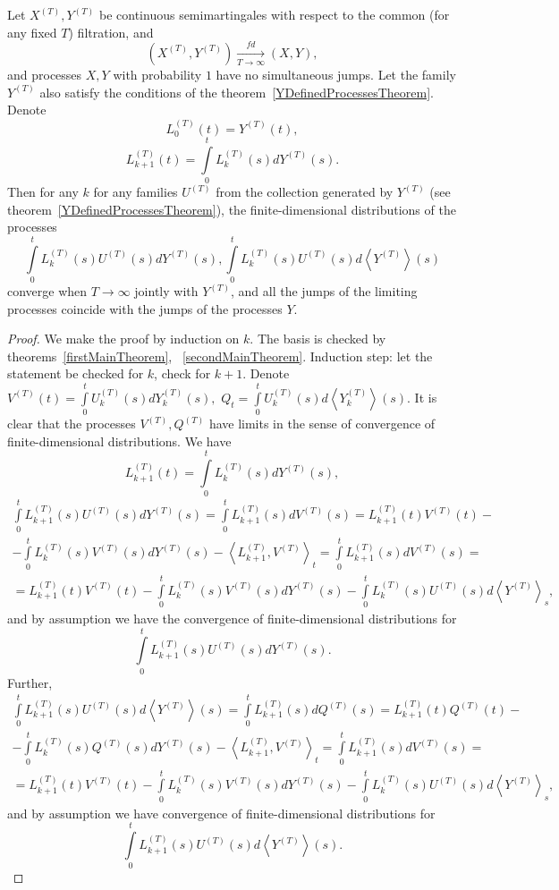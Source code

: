 \documentclass[12pt, a4paper, titlepage]{article}
\begin{document}
\begin{theorem}\label{generalTheorem}
Let $X^{(T)}, Y^{(T)}$ be continuous semimartingales
with respect to the common (for any fixed $T$)
filtration, and
$$(X^{(T)}, Y^{(T)})\xrightarrow[T \to \infty]{fd}(X, Y),$$
and processes $X, Y$ with probability $1$ have no simultaneous jumps.  
Let the family $Y^{(T)}$ also satisfy the conditions of the theorem~\ref{YDefinedProcessesTheorem}.
Denote
$$L^{(T)}_0(t) = Y^{(T)}(t),$$
$$L^{(T)}_{k+1}(t) = \int\limits_0^t L_k^{(T)}(s) dY^{(T)}(s).$$
Then for any $k$ for any families $U^{(T)}$ from the collection
generated by $Y^{(T)}$ (see theorem~\ref{YDefinedProcessesTheorem}),
the finite-dimensional distributions of the processes
$$\int\limits_0^t L_k^{(T)}(s)U^{(T)}(s)dY^{(T)}(s),
\int\limits_0^t L_k^{(T)}(s)U^{(T)}(s)d\left<Y^{(T)}\right>(s)$$
converge when $T \to \infty$ jointly with $Y^{(T)}$,
and all the jumps of the limiting processes coincide with the jumps
of the processes $Y$. 
\begin{proof}
 We make the proof by induction on $k$. 
The basis is checked by theorems~\ref{firstMainTheorem},
~\ref{secondMainTheorem}.
Induction step: let the statement be checked for $k$, check for $k+1$. 
Denote $V^{(T)}(t)=\int\limits_0^t U_k^{(T)}(s)dY_k^{(T)}(s),$
$Q_t=\int\limits_0^t U_k^{(T)}(s)d\left<Y_k^{(T)}\right>(s).$
It is clear that the processes $V^{(T)}, Q^{(T)}$ have limits in the sense 
of convergence of finite-dimensional distributions. 
We have
$$L^{(T)}_{k+1}(t) = \int\limits_0^t L_k^{(T)}(s) dY^{(T)}(s),$$
\begin{multline*}
 \int\limits_0^t L_{k+1}^{(T)}(s)U^{(T)}(s)dY^{(T)}(s) = \int\limits_0^t L_{k+1}^{(T)}(s) dV^{(T)}(s)=
L_{k+1}^{(T)}(t) V^{(T)}(t)-\\-
\int\limits_0^t L_k^{(T)}(s)V^{(T)}(s)dY^{(T)}(s)-
\left<L_{k+1}^{(T)}, V^{(T)}\right>_t=
\int\limits_0^t L_{k+1}^{(T)}(s) dV^{(T)}(s)=\\=
L_{k+1}^{(T)}(t) V^{(T)}(t)-
\int\limits_0^t L_k^{(T)}(s)V^{(T)}(s)dY^{(T)}(s)-
\int\limits_0^t L_k^{(T)}(s)U^{(T)}(s)d\left<Y^{(T)}\right>_s,
\end{multline*}
and by assumption we have the convergence of finite-dimensional distributions for 
$$\int\limits_0^t L_{k+1}^{(T)}(s)U^{(T)}(s)dY^{(T)}(s).$$
Further,  
\begin{multline*}
 \int\limits_0^t L_{k+1}^{(T)}(s)U^{(T)}(s)d\left<Y^{(T)}\right>(s) =
\int\limits_0^t L_{k+1}^{(T)}(s) dQ^{(T)}(s)=
L_{k+1}^{(T)}(t) Q^{(T)}(t)-\\-
\int\limits_0^t L_k^{(T)}(s)Q^{(T)}(s)dY^{(T)}(s)-
\left<L_{k+1}^{(T)}, V^{(T)}\right>_t=
\int\limits_0^t L_{k+1}^{(T)}(s) dV^{(T)}(s)=\\=
L_{k+1}^{(T)}(t) V^{(T)}(t)-
\int\limits_0^t L_k^{(T)}(s)V^{(T)}(s)dY^{(T)}(s)-
\int\limits_0^t L_k^{(T)}(s)U^{(T)}(s)d\left<Y^{(T)}\right>_s,
\end{multline*}
and by assumption we have convergence of finite-dimensional distributions for
$$\int\limits_0^t L_{k+1}^{(T)}(s)U^{(T)}(s)d\left<Y^{(T)}\right>(s).$$
\end{proof}
\end{theorem}
\end{document}
